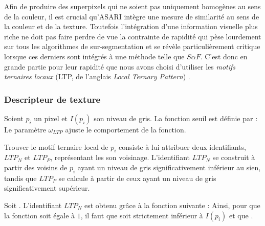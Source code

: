 Afin de produire des superpixels qui ne soient pas uniquement homogènes au sens de la couleur, il est crucial qu'ASARI intègre une mesure de similarité au sens de la couleur et de la texture. Toutefois l'intégration d'une information visuelle plus riche ne doit pas faire perdre de vue la contrainte de rapidité qui pèse lourdement sur tous les algorithmes de sur-segmentation et se révèle particulièrement critique lorsque ces derniers sont intégrés à une méthode telle que $S \alpha F$. C'est donc en grande partie pour leur rapidité que nous avons choisi d'utiliser  les \emph{motifs ternaires locaux} (LTP, de l'anglais \og \emph{Local Ternary Pattern}\fg) \cite{tang2012topology}. 

\subsubsection{Descripteur de texture}
 Soient $p_{i}$ un pixel et $I(p_{i})$ son niveau de gris. La fonction seuil   est définie par :
Le paramètre $\omega_{LTP}$ ajuste le comportement de la fonction.

Trouver le motif ternaire local de $p_{i}$ consiste à lui attribuer deux identifiants, $LTP_{N}$ et $LTP_{P}$, représentant les  son voisinage. L'identifiant $LTP_{N}$ se construit à partir des voisins de $p_{i}$ ayant un niveau de gris significativement inférieur au sien, tandis que $LTP_{P}$ se calcule à partir de ceux ayant un niveau de gris significativement supérieur. 
 
 
Soit . L'identifiant $LTP_{N}$ est obtenu  grâce à la fonction  suivante : 
Ainsi, pour que la fonction  soit égale à $1$, il faut que  soit strictement inférieur à $I(p_{i})$ et que .
 
